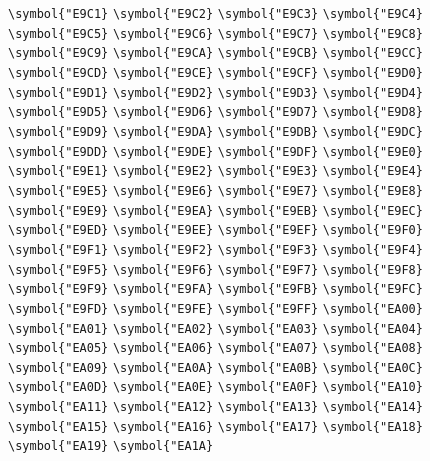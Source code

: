 \documentclass{ctexbook}
\begin{document}
 \verb|\symbol{"E9C1}|  \verb|\symbol{"E9C2}|  \verb|\symbol{"E9C3}|  \verb|\symbol{"E9C4}|  \verb|\symbol{"E9C5}|  \verb|\symbol{"E9C6}|  \verb|\symbol{"E9C7}|  \verb|\symbol{"E9C8}|  \verb|\symbol{"E9C9}|  \verb|\symbol{"E9CA}|  \verb|\symbol{"E9CB}|  \verb|\symbol{"E9CC}|  \verb|\symbol{"E9CD}|  \verb|\symbol{"E9CE}|  \verb|\symbol{"E9CF}|  \verb|\symbol{"E9D0}|  \verb|\symbol{"E9D1}|  \verb|\symbol{"E9D2}|  \verb|\symbol{"E9D3}|  \verb|\symbol{"E9D4}|  \verb|\symbol{"E9D5}|  \verb|\symbol{"E9D6}|  \verb|\symbol{"E9D7}|  \verb|\symbol{"E9D8}|  \verb|\symbol{"E9D9}|  \verb|\symbol{"E9DA}|  \verb|\symbol{"E9DB}|  \verb|\symbol{"E9DC}|  \verb|\symbol{"E9DD}|  \verb|\symbol{"E9DE}|  \verb|\symbol{"E9DF}|  \verb|\symbol{"E9E0}|  \verb|\symbol{"E9E1}|  \verb|\symbol{"E9E2}|  \verb|\symbol{"E9E3}|  \verb|\symbol{"E9E4}|  \verb|\symbol{"E9E5}|  \verb|\symbol{"E9E6}|  \verb|\symbol{"E9E7}|  \verb|\symbol{"E9E8}|  \verb|\symbol{"E9E9}|  \verb|\symbol{"E9EA}|  \verb|\symbol{"E9EB}|  \verb|\symbol{"E9EC}|  \verb|\symbol{"E9ED}|  \verb|\symbol{"E9EE}|  \verb|\symbol{"E9EF}|  \verb|\symbol{"E9F0}|  \verb|\symbol{"E9F1}|  \verb|\symbol{"E9F2}|  \verb|\symbol{"E9F3}|  \verb|\symbol{"E9F4}|  \verb|\symbol{"E9F5}|  \verb|\symbol{"E9F6}|  \verb|\symbol{"E9F7}|  \verb|\symbol{"E9F8}|  \verb|\symbol{"E9F9}|  \verb|\symbol{"E9FA}|  \verb|\symbol{"E9FB}|  \verb|\symbol{"E9FC}|  \verb|\symbol{"E9FD}|  \verb|\symbol{"E9FE}|  \verb|\symbol{"E9FF}|  \verb|\symbol{"EA00}|  \verb|\symbol{"EA01}|  \verb|\symbol{"EA02}|  \verb|\symbol{"EA03}|  \verb|\symbol{"EA04}|  \verb|\symbol{"EA05}|  \verb|\symbol{"EA06}|  \verb|\symbol{"EA07}|  \verb|\symbol{"EA08}|  \verb|\symbol{"EA09}|  \verb|\symbol{"EA0A}|  \verb|\symbol{"EA0B}|  \verb|\symbol{"EA0C}|  \verb|\symbol{"EA0D}|  \verb|\symbol{"EA0E}|  \verb|\symbol{"EA0F}|  \verb|\symbol{"EA10}|  \verb|\symbol{"EA11}|  \verb|\symbol{"EA12}|  \verb|\symbol{"EA13}|  \verb|\symbol{"EA14}|  \verb|\symbol{"EA15}|  \verb|\symbol{"EA16}|  \verb|\symbol{"EA17}|  \verb|\symbol{"EA18}|  \verb|\symbol{"EA19}|  \verb|\symbol{"EA1A}| 
\end{document}
